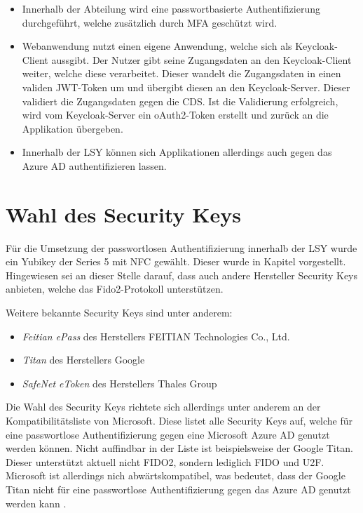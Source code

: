 \begin{itemize}
    \item Innerhalb der Abteilung wird eine passwortbasierte Authentifizierung durchgeführt, welche zusätzlich durch \ac{MFA} geschützt wird.
    \item Webanwendung nutzt einen eigene Anwendung, welche sich als Keycloak-Client aussgibt. Der Nutzer gibt seine Zugangsdaten an den Keycloak-Client weiter, welche diese verarbeitet. Dieser wandelt die Zugangsdaten in einen validen JWT-Token um und übergibt diesen an den Keycloak-Server. Dieser validiert die Zugangsdaten gegen die \ac{CDS}. Ist die Validierung erfolgreich, wird vom Keycloak-Server ein oAuth2-Token erstellt und zurück an die Applikation übergeben.
    \item Innerhalb der \ac{LSY} können sich Applikationen allerdings auch gegen das Azure \ac{AD} authentifizieren lassen. 
\end{itemize}

\section{Wahl des Security Keys} \label{secwahl}
Für die Umsetzung der passwortlosen Authentifizierung innerhalb der \ac{LSY} wurde ein Yubikey der Series 5 mit NFC gewählt. Dieser wurde in Kapitel vorgestellt. Hingewiesen sei an dieser Stelle darauf, dass auch andere Hersteller Security Keys anbieten, welche das Fido2-Protokoll unterstützen. 

Weitere bekannte Security Keys sind unter anderem:
\begin{itemize}
    \item \textit{Feitian ePass} des Herstellers FEITIAN Technologies Co., Ltd.
    \item \textit{Titan} des Herstellers Google
    \item \textit{SafeNet eToken} des Herstellers Thales Group
\end{itemize}

Die Wahl des Security Keys richtete sich allerdings unter anderem an der Kompatibilitätsliste \cite{compWin} von Microsoft. Diese listet alle Security Keys auf, welche für eine passwortlose Authentifizierung gegen eine Microsoft Azure \ac{AD} genutzt werden können. Nicht auffindbar in der Liste ist beispielsweise der Google Titan. Dieser unterstützt aktuell nicht FIDO2, sondern lediglich FIDO und \ac{U2F}. Microsoft ist allerdings nich abwärtskompatibel, was bedeutet, dass der Google Titan nicht für eine passwortlose Authentifizierung gegen das Azure \ac{AD} genutzt werden kann \cite{seckeytest}.

